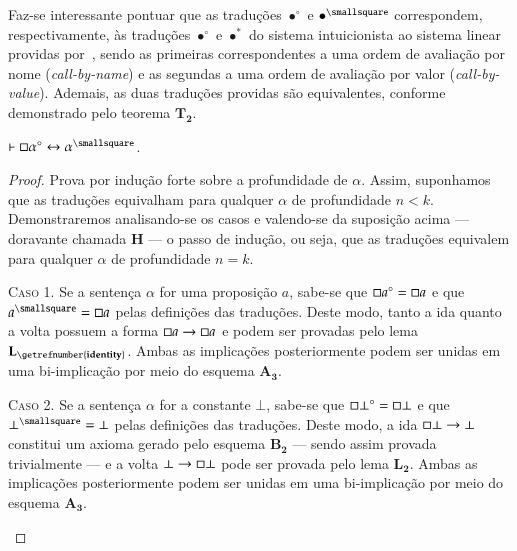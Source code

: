     Faz-se interessante pontuar que as traduções $\bullet^\circ$ e $\bullet^\smallsquare$ correspondem, respectivamente, às traduções $\bullet^\circ$ e $\bullet^*$ do sistema intuicionista ao sistema linear providas por~\cite{Girard}, sendo as primeiras correspondentes a uma ordem de avaliação por nome (\textit{call-by-name}) e as segundas a uma ordem de avaliação por valor (\textit{call-by-value}). 
    Ademais, as duas traduções providas são equivalentes, conforme demonstrado pelo teorema $\mathbf{T_2}$.

    \begin{theorem}
        $\entails\nec\alpha^\circ\leftrightarrow\alpha^\smallsquare$.

        \begin{proof}
            Prova por indução forte sobre a profundidade de $\alpha$.
            Assim, suponhamos que as traduções equivalham para qualquer $\alpha$ de profundidade $n<k$.
            Demonstraremos analisando-se os casos e valendo-se da suposição acima --- doravante chamada $\mathbf{H}$ --- o passo de indução, ou seja, que as traduções equivalem para qualquer $\alpha$ de profundidade $n=k$.
    
            \begin{case}
                \textsc{Caso 1.}
                Se a sentença $\alpha$ for uma proposição $a$, sabe-se que $\mathord{\square} a^\circ=\mathord{\square} a$ e que $a^\smallsquare=\nec a$ pelas definições das traduções.
                Deste modo, tanto a ida quanto a volta possuem a forma $\mathord{\square} a\to\mathord{\square} a$ e podem ser provadas pelo lema \hyperref[identity]{$\mathbf{L_\getrefnumber{identity}}$}.
                Ambas as implicações posteriormente podem ser unidas em uma bi-implicação por meio do esquema \hyperref[MA3]{$\mathbf{A_3}$}.
            \end{case}

            \begin{case}
                \textsc{Caso 2.}
                Se a sentença $\alpha$ for a constante $\bot$, sabe-se que $\mathord{\square}\bot^\circ=\mathord{\square}\bot$ e que $\bot^\smallsquare=\bot$ pelas definições das traduções.
                Deste modo, a ida $\mathord{\square}\bot\to\bot$ constitui um axioma gerado pelo esquema \hyperref[MB2]{$\mathbf{B_2}$} --- sendo assim provada trivialmente --- e a volta $\bot\to\mathord{\square}\bot$ pode ser provada pelo lema \hyperref[explosion]{$\mathbf{L_2}$}.
                Ambas as implicações posteriormente podem ser unidas em uma bi-implicação por meio do esquema \hyperref[MA3]{$\mathbf{A_3}$}.
            \end{case}
    

\end{proof}
\end{theorem}
